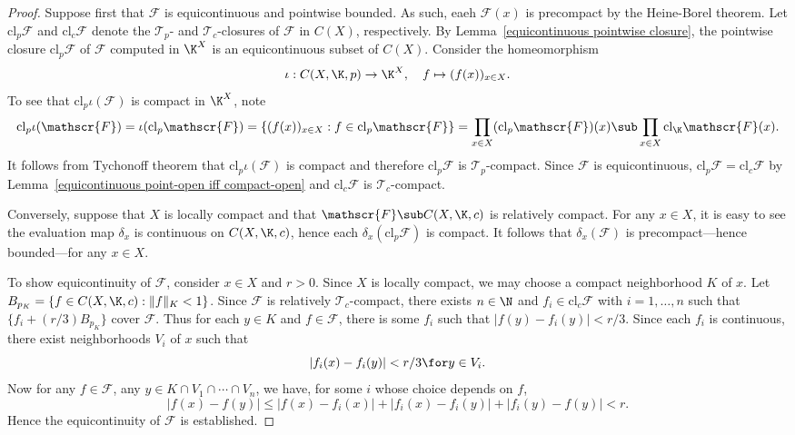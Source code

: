 \begin{proof}
Suppose first that $\mathscr{F}$ is equicontinuous and pointwise bounded. As such, eaeh $\mathscr{F}(x)$ is precompact by the Heine-Borel theorem. Let $\mathrm{cl}_p\mathscr{F}$ and $\mathrm{cl}_c\mathscr{F}$ denote the $\mathcal{T}_p$- and $\mathcal{T}_c$-closures of $\mathscr{F}$ in $C(X)$, respectively. By Lemma~\ref{equicontinuous pointwise closure}, the pointwise closure $\mathrm{cl}_p\mathscr{F}$ of $\mathscr{F}$ computed in $\K^X$ is an equicontinuous subset of $C(X)$. Consider the homeomorphism
\[\iota:C(X,\K,p)\to\K^X,\quad f\mapsto (f(x))_{x\in X}.\]
To see that $\mathrm{cl}_p\iota(\mathscr{F})$ is compact in $\K^X$, note
\[\mathrm{cl}_p\iota(\mathscr{F})=\iota(\mathrm{cl}_p\mathscr{F})=\{(f(x))_{x\in X}:f\in\mathrm{cl}_p\mathscr{F}\}=\prod_{x\in X}(\mathrm{cl}_p\mathscr{F})(x)\sub\prod_{x\in X}\mathrm{cl}_{\K}\mathscr{F}(x).\]
It follows from Tychonoff theorem that $\mathrm{cl}_p\iota(\mathscr{F})$ is compact and therefore $\mathrm{cl}_p\mathscr{F}$ is $\mathcal{T}_p$-compact. Since $\mathscr{F}$ is equicontinuous, $\mathrm{cl}_p\mathscr{F}=\mathrm{cl}_c\mathscr{F}$ by Lemma~\ref{equicontinuous point-open iff compact-open} and $\mathrm{cl}_c\mathscr{F}$ is $\mathcal{T}_c$-compact.\par
Conversely, suppose that $X$ is locally compact and that $\mathscr{F}\sub C(X,\K,c)$ is relatively compact. For any $x\in X$, it is easy to see the evaluation map $\delta_x$ is continuous on $C(X,\K,c)$, hence each $\delta_x(\mathrm{cl}_p\mathscr{F})$ is compact. It follows that $\delta_x(\mathscr{F})$ is precompact---hence bounded---for any $x\in X$.\par
To show equicontinuity of $\mathscr{F}$, consider $x\in X$ and $r>0$. Since $X$ is locally compact, we may choose a compact neighborhood $K$ of $x$. Let $B_{p_K}=\{f\in C(X,\K,c):\|f\|_K<1\}$. Since $\mathscr{F}$ is relatively $\mathcal{T}_c$-compact, there exists $n\in\N$ and $f_i\in\mathrm{cl}_c\mathscr{F}$ with $i=1,\dots,n$ such that $\{f_i+(r/3)B_{p_K}\}$ cover $\mathscr{F}$. Thus for each $y\in K$ and $f\in \mathscr{F}$, there is some $f_i$ such that $|f(y)-f_i(y)|<r/3$. Since each $f_i$ is continuous, there exist neighborhoods $V_i$ of $x$ such that
\[|f_i(x)-f_i(y)|<r/3\for y\in V_i.\]
Now for any $f\in \mathscr{F}$, any $y\in K\cap V_1\cap\cdots\cap V_n$, we have, for some $i$ whose choice depends on $f$,
\[|f(x)-f(y)|\leq|f(x)-f_i(x)|+|f_i(x)-f_i(y)|+|f_i(y)-f(y)|<r.\]
Hence the equicontinuity of $\mathscr{F}$ is established.
\end{proof}
